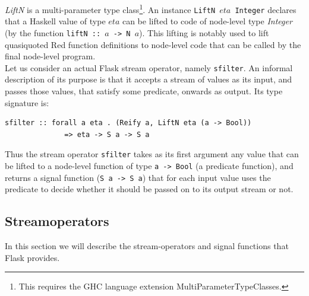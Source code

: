 \documentclass[a4paper, oneside, final]{memoir}
\begin{document}
\textit{LiftN} is a multi-parameter type class\footnote{This requires
  the GHC language extension MultiParameterTypeClasses.}. An instance
\texttt{LiftN $eta$ Integer} declares that a Haskell value of type
$eta$ can be lifted to code of node-level type \textit{Integer} (by
the function \texttt{liftN :: $a$ -> N $a$}).  This lifting is notably
used to lift quasiquoted Red function definitions to
node-level code that can be called by the final node-level program.\\

\noindent
Let us consider an actual Flask stream operator, namely
\texttt{sfilter}. An informal description of its purpose is that it
accepts a stream of values as its input, and passes those values, that
satisfy some predicate, onwards as output.  Its type signature is:

\begin{verbatim}
sfilter :: forall a eta . (Reify a, LiftN eta (a -> Bool))
              => eta -> S a -> S a
\end{verbatim}

Thus the stream operator \texttt{sfilter} takes as its first argument
any value that can be lifted to a node-level function of type
\texttt{a -> Bool} (a predicate function), and returns a signal
function (\texttt{S a -> S a}) that for each input value uses the
predicate to decide whether it should be passed on to its output
stream or not.


\subsection{Streamoperators}
\label{sec:streamoperators}
In this section we will describe the stream-operators and signal
functions that Flask provides.
\end{document}
